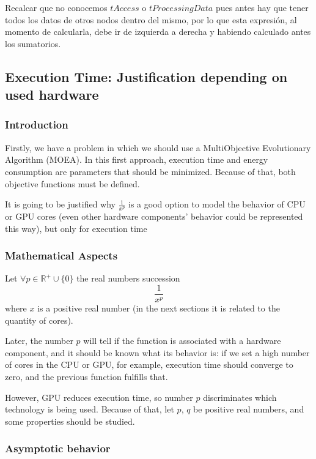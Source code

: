 \documentclass{article}
\begin{document}
Recalcar que no conocemos \(tAccess\) o \(tProcessingData\) pues antes hay que tener todos los datos de otros nodos dentro del mismo, por lo que esta expresión, al momento de calcularla, debe ir de izquierda a derecha y habiendo calculado antes los sumatorios.

\subsection{Execution Time: Justification depending on used hardware}

\subsubsection{Introduction}

Firstly, we have a problem in which we should use a MultiObjective Evolutionary Algorithm (MOEA). In this first approach, execution time and energy consumption are parameters that should be minimized. Because of that, both objective functions must be defined.

It is going to be justified why $\frac{1}{{x^p}}$ is a good option to model the behavior of CPU or GPU cores (even other hardware components' behavior could be represented this way), but only for execution time

\subsubsection{Mathematical Aspects}

Let \(\forall p \in \mathbb{R^+} \cup \{0\}\) the real numbers succession
\[
\frac{1}{{x^p}}
\]
where $x$ is a positive real number (in the next sections it is related to the quantity of cores).

Later, the number $p$ will tell if the function is associated with a hardware component, and it should be known what its behavior is: if we set a high number of cores in the CPU or GPU, for example, execution time should converge to zero, and the previous function fulfills that.

However, GPU reduces execution time, so number $p$ discriminates which technology is being used. Because of that, let $p$, $q$ be positive real numbers, and some properties should be studied.

\subsubsection{Asymptotic behavior}
\end{document}
